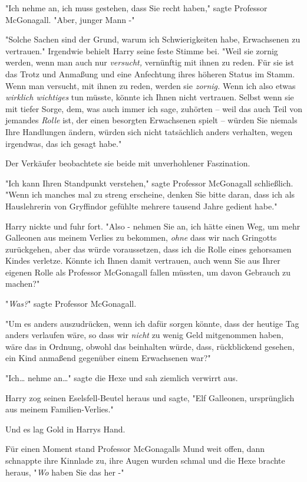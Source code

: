 {"Ich nehme an, ich muss gestehen, dass Sie recht haben," sagte Professor McGonagall. "Aber, junger Mann -"

"Solche Sachen sind der Grund, warum ich Schwierigkeiten habe, Erwachsenen zu vertrauen." Irgendwie behielt Harry seine feste Stimme bei. "Weil sie zornig werden, wenn man auch nur \emph{versucht,} vernünftig mit ihnen zu reden. Für sie ist das Trotz und Anmaßung und eine Anfechtung ihres höheren Status im Stamm. Wenn man versucht, mit ihnen zu reden, werden sie \emph{zornig.} Wenn ich also etwas \emph{wirklich wichtiges} tun müsste, könnte ich Ihnen nicht vertrauen. Selbst wenn sie mit tiefer Sorge, dem, was auch immer ich sage, zuhörten -- weil das auch Teil von jemandes \emph{Rolle} ist, der einen besorgten Erwachsenen spielt -- würden Sie niemals Ihre Handlungen ändern, würden sich nicht tatsächlich anders verhalten, wegen irgendwas, das ich gesagt habe."

Der Verkäufer beobachtete sie beide mit unverhohlener Faszination.

"Ich kann Ihren Standpunkt verstehen," sagte Professor McGonagall schließlich. "Wenn ich manches mal zu streng erscheine, denken Sie bitte daran, dass ich als Hauslehrerin von Gryffindor gefühlte mehrere tausend Jahre gedient habe."

Harry nickte und fuhr fort. "Also - nehmen Sie an, ich hätte einen Weg, um mehr Galleonen aus meinem Verlies zu bekommen, \emph{ohne} dass wir nach Gringotts zurückgehen, aber das würde voraussetzen, dass ich die Rolle eines gehorsamen Kindes verletze. Könnte ich Ihnen damit vertrauen, auch wenn Sie aus Ihrer eigenen Rolle als Professor McGonagall fallen müssten, um davon Gebrauch zu machen?"

"\emph{Was?}" sagte Professor McGonagall.

"Um es anders auszudrücken, wenn ich dafür sorgen könnte, dass der heutige Tag anders verlaufen wäre, so dass wir \emph{nicht} zu wenig Geld mitgenommen haben, wäre das in Ordnung, obwohl das beinhalten würde, dass, rückblickend gesehen, ein Kind anmaßend gegenüber einem Erwachsenen war?"

"Ich… nehme an…" sagte die Hexe und sah ziemlich verwirrt aus.

Harry zog seinen Eselsfell-Beutel heraus und sagte, "Elf Galleonen, ursprünglich aus meinem Familien-Verlies."

Und es lag Gold in Harrys Hand.

Für einen Moment stand Professor McGonagalls Mund weit offen, dann schnappte ihre Kinnlade zu, ihre Augen wurden schmal und die Hexe brachte heraus, "\emph{Wo} haben Sie das her -"

}
